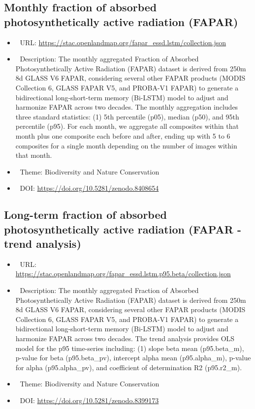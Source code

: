 \documentclass[
  graybox,natbib,nospthms]{svmono}
\providecommand{\tightlist}{%
  \setlength{\itemsep}{0pt}\setlength{\parskip}{0pt}}
\providecommand{\tightlist}{\setlength{\itemsep}{0pt}\setlength{\parskip}{0pt}}
\begin{document}
\hypertarget{monthly-fraction-of-absorbed-photosynthetically-active-radiation-fapar}{%
\subsection{Monthly fraction of absorbed photosynthetically active radiation (FAPAR)}\label{monthly-fraction-of-absorbed-photosynthetically-active-radiation-fapar}}

\begin{itemize}
\tightlist
\item
  🔗 URL: \url{https://stac.openlandmap.org/fapar_essd.lstm/collection.json}
\item
  📰 Description: The monthly aggregated Fraction of Absorbed Photosynthetically Active Radiation (FAPAR) dataset is derived from 250m 8d GLASS V6 FAPAR, considering several other FAPAR products (MODIS Collection 6, GLASS FAPAR V5, and PROBA-V1 FAPAR) to generate a bidirectional long-short-term memory (Bi-LSTM) model to adjust and harmonize FAPAR across two decades. The monthly aggregation includes three standard statistics: (1) 5th percentile (p05), median (p50), and 95th percentile (p95). For each month, we aggregate all composites within that month plus one composite each before and after, ending up with 5 to 6 composites for a single month depending on the number of images within that month.
\item
  📝 Theme: Biodiversity and Nature Conservation
\item
  📂 DOI: \url{https://doi.org/10.5281/zenodo.8408654}
\end{itemize}

\hypertarget{long-term-fraction-of-absorbed-photosynthetically-active-radiation-fapar---trend-analysis}{%
\subsection{Long-term fraction of absorbed photosynthetically active radiation (FAPAR - trend analysis)}\label{long-term-fraction-of-absorbed-photosynthetically-active-radiation-fapar---trend-analysis}}

\begin{itemize}
\tightlist
\item
  🔗 URL: \url{https://stac.openlandmap.org/fapar_essd.lstm.p95.beta/collection.json}
\item
  📰 Description: The monthly aggregated Fraction of Absorbed Photosynthetically Active Radiation (FAPAR) dataset is derived from 250m 8d GLASS V6 FAPAR, considering several other FAPAR products (MODIS Collection 6, GLASS FAPAR V5, and PROBA-V1 FAPAR) to generate a bidirectional long-short-term memory (Bi-LSTM) model to adjust and harmonize FAPAR across two decades. The trend analysis provides OLS model for the p95 time-series including: (1) slope beta mean (p95.beta\_m), p-value for beta (p95.beta\_pv), intercept alpha mean (p95.alpha\_m), p-value for alpha (p95.alpha\_pv), and coefficient of determination R2 (p95.r2\_m).
\item
  📝 Theme: Biodiversity and Nature Conservation
\item
  📂 DOI: \url{https://doi.org/10.5281/zenodo.8399173}
\end{itemize}
\end{document}
